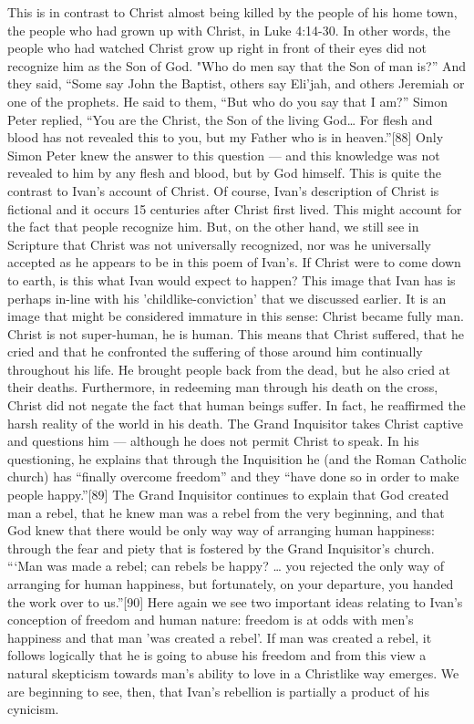 This is in contrast to Christ almost being killed by the people of his home town, the people who had grown up with Christ, in Luke 4:14-30. In other words, the people who had watched Christ grow up right in front of their eyes did not recognize him as the Son of God. "Who do men say that the Son of man is?” And they said, “Some say John the Baptist, others say Eli’jah, and others Jeremiah or one of the prophets. He said to them, “But who do you say that I am?” Simon Peter replied, “You are the Christ, the Son of the living God… For flesh and blood has not revealed this to you, but my Father who is in heaven.”[88] Only Simon Peter knew the answer to this question — and this knowledge was not revealed to him by any flesh and blood, but by God himself. This is quite the contrast to Ivan’s account of Christ.
Of course, Ivan's description of Christ is fictional and it occurs 15 centuries after Christ first lived. This might account for the fact that people recognize him. But, on the other hand, we still see in Scripture that Christ was not universally recognized, nor was he universally accepted as he appears to be in this poem of Ivan's. If Christ were to come down to earth, is this what Ivan would expect to happen? This image that Ivan has is perhaps in-line with his 'childlike-conviction' that we discussed earlier. It is an image that might be considered immature in this sense: Christ became fully man. Christ is not super-human, he is human. This means that Christ suffered, that he cried and that he confronted the suffering of those around him continually throughout his life. He brought people back from the dead, but he also cried at their deaths. Furthermore, in redeeming man through his death on the cross, Christ did not negate the fact that human beings suffer. In fact, he reaffirmed the harsh reality of the world in his death.
The Grand Inquisitor takes Christ captive and questions him — although he does not permit Christ to speak. In his questioning, he explains that through the Inquisition he (and the Roman Catholic church) has “finally overcome freedom” and they “have done so in order to make people happy.”[89] The Grand Inquisitor continues to explain that God created man a rebel, that he knew man was a rebel from the very beginning, and that God knew that there would be only way way of arranging human happiness: through the fear and piety that is fostered by the Grand Inquisitor’s church. “‘Man was made a rebel; can rebels be happy? … you rejected the only way of arranging for human happiness, but fortunately, on your departure, you handed the work over to us.”[90] Here again we see two important ideas relating to Ivan's conception of freedom and human nature: freedom is at odds with men's happiness and that man 'was created a rebel'. If man was created a rebel, it follows logically that he is going to abuse his freedom and from this view a natural skepticism towards man's ability to love in a Christlike way emerges. We are beginning to see, then, that Ivan's rebellion is partially a product of his cynicism.
